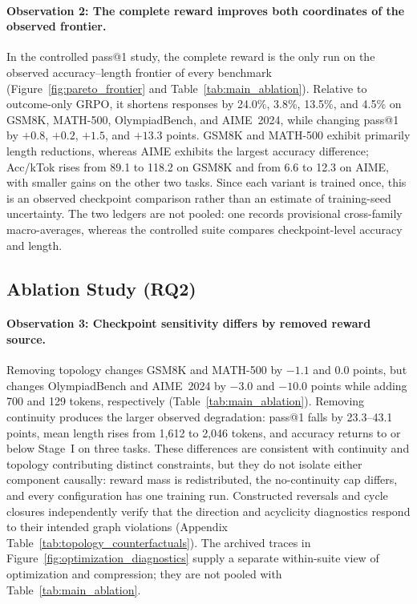 \paragraph{Observation 2: The complete reward improves both coordinates of the observed frontier.}
In the controlled pass@1 study, the complete reward is the only run on the observed accuracy--length frontier of every benchmark (Figure~\ref{fig:pareto_frontier} and Table~\ref{tab:main_ablation}). Relative to outcome-only GRPO, it shortens responses by 24.0\%, 3.8\%, 13.5\%, and 4.5\% on GSM8K, MATH-500, OlympiadBench, and AIME~2024, while changing pass@1 by $+0.8$, $+0.2$, $+1.5$, and $+13.3$ points. GSM8K and MATH-500 exhibit primarily length reductions, whereas AIME exhibits the largest accuracy difference; Acc/kTok rises from 89.1 to 118.2 on GSM8K and from 6.6 to 12.3 on AIME, with smaller gains on the other two tasks. Since each variant is trained once, this is an observed checkpoint comparison rather than an estimate of training-seed uncertainty. The two ledgers are not pooled: one records provisional cross-family macro-averages, whereas the controlled suite compares checkpoint-level accuracy and length.

\subsection{Ablation Study (RQ2)}
\label{sec:rq2}

\paragraph{Observation 3: Checkpoint sensitivity differs by removed reward source.}
Removing topology changes GSM8K and MATH-500 by $-1.1$ and $0.0$ points, but changes OlympiadBench and AIME~2024 by $-3.0$ and $-10.0$ points while adding 700 and 129 tokens, respectively (Table~\ref{tab:main_ablation}). Removing continuity produces the larger observed degradation: pass@1 falls by 23.3--43.1 points, mean length rises from 1{,}612 to 2{,}046 tokens, and accuracy returns to or below Stage~I on three tasks. These differences are consistent with continuity and topology contributing distinct constraints, but they do not isolate either component causally: reward mass is redistributed, the no-continuity cap differs, and every configuration has one training run. Constructed reversals and cycle closures independently verify that the direction and acyclicity diagnostics respond to their intended graph violations (Appendix Table~\ref{tab:topology_counterfactuals}). The archived traces in Figure~\ref{fig:optimization_diagnostics} supply a separate within-suite view of optimization and compression; they are not pooled with Table~\ref{tab:main_ablation}.

